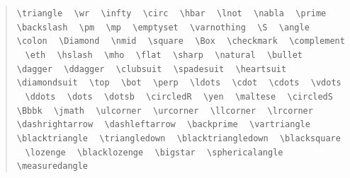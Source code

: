 \documentclass{article}
\newcommand{\texcommand}[1]{\textbackslash{}#1}
\newcommand{\spacer}{\,\,\, \hfil}
\newenvironment{mylist}{\begin{quote}}{\end{quote}}
\begin{document}
\begin{mylist}
\texttt{\texcommand{triangle}} \spacer 
\texttt{\texcommand{wr}} \spacer 
\texttt{\texcommand{infty}} \spacer 
\texttt{\texcommand{circ}} \spacer 
\texttt{\texcommand{hbar}} \spacer 
\texttt{\texcommand{lnot}} \spacer 
\texttt{\texcommand{nabla}} \spacer 
\texttt{\texcommand{prime}} \spacer 
\texttt{\texcommand{backslash}} \spacer 
\texttt{\texcommand{pm}} \spacer 
\texttt{\texcommand{mp}} \spacer 
\texttt{\texcommand{emptyset}} \spacer 
\texttt{\texcommand{varnothing}} \spacer 
\texttt{\texcommand{S}} \spacer 
\texttt{\texcommand{angle}} \spacer 
\texttt{\texcommand{colon}} \spacer 
\texttt{\texcommand{Diamond}} \spacer 
\texttt{\texcommand{nmid}} \spacer 
\texttt{\texcommand{square}} \spacer 
\texttt{\texcommand{Box}} \spacer 
\texttt{\texcommand{checkmark}} \spacer 
\texttt{\texcommand{complement}} \spacer 
\texttt{\texcommand{eth}} \spacer 
\texttt{\texcommand{hslash}} \spacer 
\texttt{\texcommand{mho}} \spacer 
\texttt{\texcommand{flat}} \spacer 
\texttt{\texcommand{sharp}} \spacer 
\texttt{\texcommand{natural}} \spacer 
\texttt{\texcommand{bullet}} \spacer 
\texttt{\texcommand{dagger}} \spacer 
\texttt{\texcommand{ddagger}} \spacer 
\texttt{\texcommand{clubsuit}} \spacer 
\texttt{\texcommand{spadesuit}} \spacer 
\texttt{\texcommand{heartsuit}} \spacer 
\texttt{\texcommand{diamondsuit}} \spacer 
\texttt{\texcommand{top}} \spacer 
\texttt{\texcommand{bot}} \spacer 
\texttt{\texcommand{perp}} \spacer 
\texttt{\texcommand{ldots}} \spacer 
\texttt{\texcommand{cdot}} \spacer 
\texttt{\texcommand{cdots}} \spacer 
\texttt{\texcommand{vdots}} \spacer 
\texttt{\texcommand{ddots}} \spacer 
\texttt{\texcommand{dots}} \spacer 
\texttt{\texcommand{dotsb}} \spacer
\texttt{\texcommand{circledR}} \spacer 
\texttt{\texcommand{yen}} \spacer 
\texttt{\texcommand{maltese}} \spacer 
\texttt{\texcommand{circledS}} \spacer 
\texttt{\texcommand{Bbbk}} \spacer 
\texttt{\texcommand{jmath}} \spacer 
\texttt{\texcommand{ulcorner}} \spacer 
\texttt{\texcommand{urcorner}} \spacer 
\texttt{\texcommand{llcorner}} \spacer 
\texttt{\texcommand{lrcorner}} \spacer 
\texttt{\texcommand{dashrightarrow}} \spacer 
\texttt{\texcommand{dashleftarrow}} \spacer 
\texttt{\texcommand{backprime}} \spacer 
\texttt{\texcommand{vartriangle}} \spacer 
\texttt{\texcommand{blacktriangle}} \spacer 
\texttt{\texcommand{triangledown}} \spacer 
\texttt{\texcommand{blacktriangledown}} \spacer 
\texttt{\texcommand{blacksquare}} \spacer 
\texttt{\texcommand{lozenge}} \spacer 
\texttt{\texcommand{blacklozenge}} \spacer 
\texttt{\texcommand{bigstar}} \spacer 
\texttt{\texcommand{sphericalangle}} \spacer 
\texttt{\texcommand{measuredangle}} \spacer 

\end{mylist}
\end{document}
